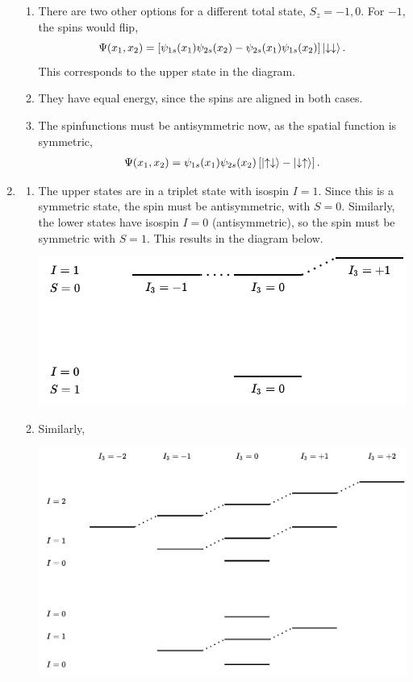 \documentclass{homework}
\begin{document}
\begin{enumerate}
\begin{enumerate}
			\item There are two other options for a different total state, $S_z = -1, 0$. For $-1$, the spins would flip,
				 $$\Psi(x_1, x_2) = \left[ \psi_{1s}(x_1) \psi_{2s}(x_2) - \psi_{2s}(x_1) \psi_{1s}(x_2) \right] \ket{\downarrow \downarrow}.$$
				This corresponds to the upper state in the diagram.
			\item They have equal energy, since the spins are aligned in both cases.
			
			\item The spinfunctions must be antisymmetric now, as the spatial function is symmetric, \begin{align*}
				\Psi(x_1, x_2) = \psi_{1s}(x_1) \psi_{2s}(x_2) \left[ \ket{\uparrow \downarrow} - \ket{\downarrow\uparrow} \right].
			\end{align*}
		\end{enumerate}
		
		\item \begin{enumerate}
			\item The upper states are in a triplet state with isospin $I=1$. Since this is a symmetric state, the spin must be antisymmetric, with $S=0$. Similarly, the lower states have isospin $I=0$ (antisymmetric), so the spin must be symmetric with $S=1$. This results in the diagram below. 
			\vspace{1em}
			\begin{center}
				\includegraphics{prob5a.drawio.pdf}
			\end{center}
		
			\item Similarly, \begin{center}
				\includegraphics[width=\linewidth]{prob5b.drawio.pdf}
			\end{center}
		

\end{enumerate}
\end{enumerate}
\end{document}
